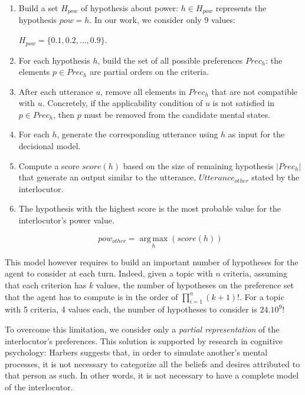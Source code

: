 \documentclass[sigconf]{aamas}  %
\begin{document}
		\begin{enumerate}
			\item Build a set $H_{pow}$ of hypothesis about power: $h\in H_{pow}$ represents the hypothesis $pow=h$. In our work, we consider only 9 values: 
			
			$H_{pow}=\{0.1, 0.2, \ldots, 0.9\}$.
			\item For each hypothesis $h$, build the set of all possible preferences $Prec_h$: the elements $p\in Prec_h$ are partial orders on the criteria.
			\item After each utterance $u$, remove all elements in $Prec_h$ that are not compatible with $u$. Concretely, if the applicability condition of $u$ is not satisfied in $p\in Prec_h$, then $p$ must be removed from the candidate mental states.
			\item For each $h$, generate the corresponding utterance using $h$ as input for the decisional model.
			\item Compute a score $score(h)$ based on the size of remaining hypothesis $|Prec_h|$ that generate an output similar to the utterance, $Utterance_{other}$ stated by the interlocutor. 
			\item 	The hypothesis with the highest score is the most probable value for the interlocutor's power value.
			
			\begin{equation}
			pow_{other} = \operatorname*{arg\,max}_{h} (score(h))
			\end{equation}
			
		\end{enumerate}
		
		This model however requires to build an important number of hypotheses for the agent to consider at each turn. Indeed, given a topic with $n$ criteria, assuming that each criterion has $k$ values, the number of hypotheses on the preference set that the agent has to compute is in the order of  $\prod_{i=1}^n (k+1)!$. For a topic with 5 criteria, 4 values each, the number of hypotheses to consider is $24.10^9$!
		
		To overcome this limitation, we consider only a \textit{partial representation} of the interlocutor's preferences. This solution is supported  by research in cognitive psychology: Harbers \cite{harbers2009modeling} suggests that, in order to simulate another's mental processes, it is not necessary to categorize all the beliefs and desires attributed to that person as such. In other words, it is not necessary to have a complete model of the interlocutor.
		
\end{document}

